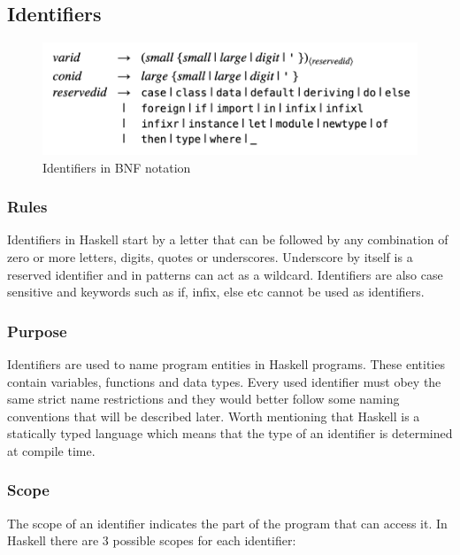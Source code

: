 \documentclass[a4paper, titlepage, twoside]{article}
\begin{document}
\subsection{Identifiers}
\label{sec:orgdd8db3b}

\begin{figure}[htbp]
\centering
\includegraphics[width=.9\linewidth]{img/2023-05-22_21-55-01_screenshot.png}
\caption{Identifiers in BNF notation \autocite[section 2.4]{marlowHaskell2010Language2010}}
\end{figure}


\subsubsection{Rules}
\label{sec:orgb17a756}

Identifiers in Haskell start by a letter that can be followed by any combination of zero or more letters, digits, quotes or underscores. Underscore by itself is a reserved identifier and in patterns can act as a wildcard. Identifiers are also case sensitive and keywords such as if, infix, else etc cannot be used as identifiers.

\subsubsection{Purpose}
\label{sec:org65f6ab1}

Identifiers are used to name program entities in Haskell programs. These entities contain variables, functions and data types. Every used identifier must obey the same strict name restrictions and they would better follow some naming conventions that will be described later. Worth mentioning that Haskell is a statically typed language which means that the type of an identifier is determined at compile time.

\subsubsection{Scope}
\label{sec:org78d92f4}

The scope of an identifier indicates the part of the program that can access it. In Haskell there are 3 possible scopes for each identifier:
\end{document}
